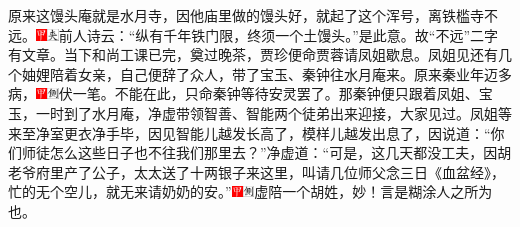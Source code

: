 原来这馒头庵就是水月寺，因他庙里做的馒头好，就起了这个浑号，离铁槛寺不远。{\includegraphics[width=3mm]{../Images/00002}\includegraphics[width=3mm]{../Images/00012}\footnotesize \kaishu 前人诗云：``纵有千年铁门限，终须一个土馒头。''是此意。故``不远''二字有文章。}当下和尚工课已完，奠过晚茶，贾珍便命贾蓉请凤姐歇息。凤姐见还有几个妯娌陪着女亲，自己便辞了众人，带了宝玉、秦钟往水月庵来。原来秦业年迈多病，{\includegraphics[width=3mm]{../Images/00002}\includegraphics[width=3mm]{../Images/00011}\footnotesize \kaishu 伏一笔。}不能在此，只命秦钟等待安灵罢了。那秦钟便只跟着凤姐、宝玉，一时到了水月庵，净虚带领智善、智能两个徒弟出来迎接，大家见过。凤姐等来至净室更衣净手毕，因见智能儿越发长高了，模样儿越发出息了，因说道：``你们师徒怎么这些日子也不往我们那里去？''净虚道：``可是，这几天都没工夫，因胡老爷府里产了公子，太太送了十两银子来这里，叫请几位师父念三日《血盆经》，忙的无个空儿，就无来请奶奶的安。''{\includegraphics[width=3mm]{../Images/00002}\includegraphics[width=3mm]{../Images/00011}\footnotesize \kaishu 虚陪一个胡姓，妙！言是糊涂人之所为也。}

